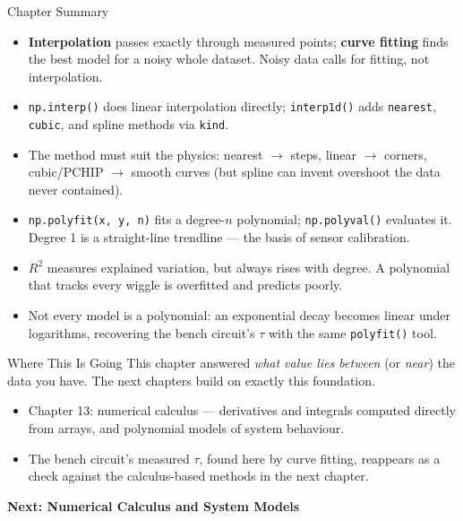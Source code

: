 \documentclass[9pt,aspectratio=169,xcolor=table]{beamer}
\begin{document}
\begin{frame}{Chapter Summary}
    \leavevmode
    \small
    \begin{itemize}
        \item \textbf{Interpolation} passes exactly through measured
              points; \textbf{curve fitting} finds the best model for a
              noisy whole dataset. Noisy data calls for fitting, not
              interpolation.
        \item \texttt{np.interp()} does linear interpolation directly;
              \texttt{interp1d()} adds \texttt{nearest}, \texttt{cubic},
              and spline methods via \texttt{kind}.
        \item The method must suit the physics: nearest $\to$ steps,
              linear $\to$ corners, cubic/PCHIP $\to$ smooth curves (but
              spline can invent overshoot the data never contained).
        \item \texttt{np.polyfit(x, y, n)} fits a degree-$n$ polynomial;
              \texttt{np.polyval()} evaluates it. Degree 1 is a
              straight-line trendline --- the basis of sensor
              calibration.
        \item $R^2$ measures explained variation, but always rises with
              degree. A polynomial that tracks every wiggle is
              \alert{overfitted} and predicts poorly.
        \item Not every model is a polynomial: an exponential decay
              becomes linear under logarithms, recovering the bench
              circuit's $\tau$ with the same \texttt{polyfit()} tool.
    \end{itemize}
\end{frame}

\begin{frame}{Where This Is Going}
    \leavevmode
    \small
    This chapter answered \emph{what value lies between} (or \emph{near})
    the data you have. The next chapters build on exactly this
    foundation.

    \vspace{3mm}
    \begin{itemize}
        \item Chapter 13: numerical calculus --- derivatives and
              integrals computed directly from arrays, and polynomial
              models of system behaviour.
        \item The bench circuit's measured $\tau$, found here by curve
              fitting, reappears as a check against the calculus-based
              methods in the next chapter.
    \end{itemize}

    \vspace{4mm}
    \begin{center}
        \large\color{primary}\textbf{Next: Numerical Calculus and System Models}
    \end{center}
\end{frame}
\end{document}
